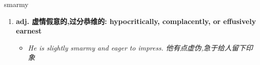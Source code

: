 
\begin{frame}
{\huge smarmy}
\begin{center}
\begin{enumerate}\Large
  \item \textbf{adj. 虚情假意的,过分恭维的: hypocritically, complacently, or effusively earnest}
  \begin{itemize}
    \item \em{\Large{He is slightly smarmy and eager to impress. 他有点虚伪,急于给人留下印象}}
  \end{itemize}
\end{enumerate}
\end{center}
\end{frame}
